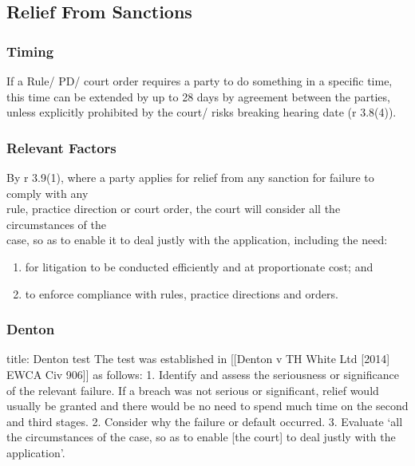 \documentclass[
]{article}
\newenvironment{Shaded}{}{}
\newcommand{\NormalTok}[1]{#1}
\providecommand{\tightlist}{%
  \setlength{\itemsep}{0pt}\setlength{\parskip}{0pt}}
\begin{document}
\hypertarget{relief-from-sanctions}{%
\subsection{Relief From Sanctions}\label{relief-from-sanctions}}

\hypertarget{timing}{%
\subsubsection{Timing}\label{timing}}

If a Rule/ PD/ court order requires a party to do something in a
specific time, this time can be extended by up to 28 days by agreement
between the parties, unless explicitly prohibited by the court/ risks
breaking hearing date (r 3.8(4)).

\hypertarget{relevant-factors-1}{%
\subsubsection{Relevant Factors}\label{relevant-factors-1}}

By r 3.9(1), where a party applies for relief from any sanction for
failure to comply with any\\
rule, practice direction or court order, the court will consider all the
circumstances of the\\
case, so as to enable it to deal justly with the application, including
the need:

\begin{enumerate}
\def\labelenumi{\arabic{enumi}.}
\tightlist
\item
  for litigation to be conducted efficiently and at proportionate cost;
  and
\item
  to enforce compliance with rules, practice directions and orders.
\end{enumerate}

\hypertarget{denton}{%
\subsubsection{Denton}\label{denton}}

\begin{Shaded}
\begin{Highlighting}[]
\NormalTok{title: Denton test}
\NormalTok{The test was established in [[Denton v TH White Ltd [2014] EWCA Civ 906]] as follows:}
\NormalTok{1. Identify and assess the seriousness or significance of the relevant failure. If a breach was not serious or significant, relief would usually be granted and there would be no need to spend much time on the second and third stages.}
\NormalTok{2. Consider why the failure or default occurred.}
\NormalTok{3. Evaluate ‘all the circumstances of the case, so as to enable [the court] to deal justly with the application’.}
\end{Highlighting}
\end{Shaded}
\end{document}
